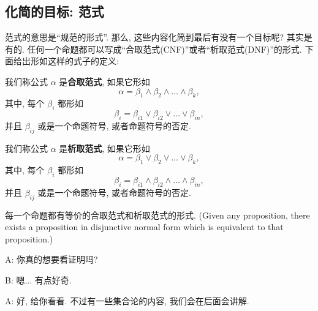 \subsection{化简的目标: 范式}

范式的意思是``规范的形式''. 那么, 这些内容化简到最后有没有一个目标呢? 其实是有的. 任何一个命题都可以写成``合取范式(CNF)''或者``析取范式(DNF)''的形式. 下面给出形如这样的式子的定义:

 
\begin{definition}
            我们称公式 $\alpha$ 是{\bf 合取范式}, 如果它形如
            \[
              \alpha = \beta_{1} \land \beta_{2} \land \dots \land \beta_{k},
            \]
            其中, 每个 $\beta_{i}$ 都形如
            \[
              \beta_{i} = \beta_{i1} \lor \beta_{i2} \lor \dots \lor \beta_{in},
            \]
            并且 $\beta_{ij}$ 或是一个命题符号, 或者命题符号的否定. 
    \end{definition}


   \begin{definition}
            我们称公式 $\alpha$ 是{\bf 析取范式}, 如果它形如
            \[
              \alpha = \beta_{1} \lor \beta_{2} \lor \dots \lor \beta_{k},
            \]
            其中, 每个 $\beta_{i}$ 都形如
            \[
              \beta_{i} = \beta_{i1} \land \beta_{i2} \land \dots \land \beta_{in},
            \]
            并且 $\beta_{ij}$ 或是一个命题符号, 或者命题符号的否定. 
    \end{definition}

\begin{theorem}
	每一个命题都有等价的合取范式和析取范式的形式. (Given any proposition, there exists a proposition in disjunctive normal form which is equivalent to that proposition.)
\end{theorem}

\begin{dialogue}
A: 你真的想要看证明吗?

B: 嗯... 有点好奇. 

A: 好, 给你看看. 不过有一些集合论的内容, 我们会在后面会讲解. 

\end{dialogue}


